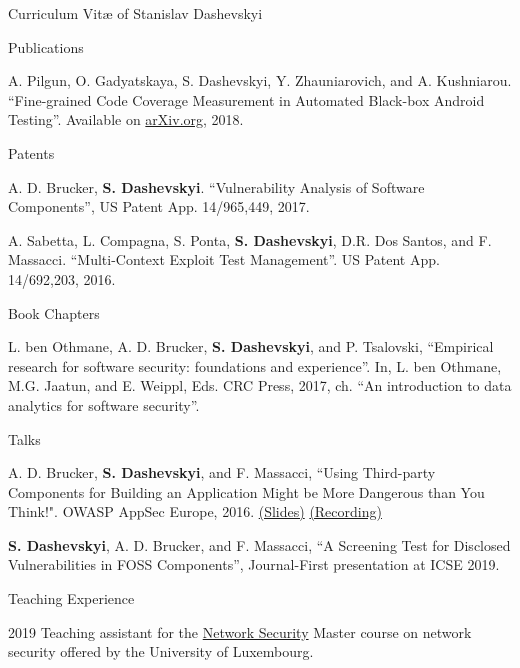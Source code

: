 \documentclass[11pt]{custom-style}
\begin{document}
\begin{cv}{Curriculum Vit\ae{} of Stanislav Dashevskyi}
\begin{cvlist}{Publications}
\begin{etaremune}
        \item A. Pilgun, O. Gadyatskaya, S. Dashevskyi, Y. Zhauniarovich, and A. Kushniarou. ``Fine-grained Code
            Coverage Measurement in Automated Black-box Android Testing''. Available on \href{https://arxiv.org/pdf/1812.10729}{arXiv.org}, 2018.
    \end{etaremune}
  \item[Patents]
    \begin{etaremune}
    \item A. D. Brucker, \textbf{S. Dashevskyi}. ``Vulnerability
      Analysis of Software Components'', US Patent App. 14/965,449,
      2017.
    \item A. Sabetta, L. Compagna, S. Ponta, \textbf{S. Dashevskyi},
      D.R. Dos Santos, and F. Massacci. ``Multi-Context Exploit Test
      Management''. US Patent App. 14/692,203, 2016.
    \end{etaremune}
  \item[Book Chapters]
    \begin{etaremune}
    \item L. ben Othmane, A. D. Brucker, \textbf{S. Dashevskyi}, and
      P. Tsalovski, ``Empirical research for software security:
      foundations and experience''. In, L. ben Othmane, M.G. Jaatun,
      and E. Weippl, Eds. CRC Press, 2017, ch. ``An introduction to
      data analytics for software security''.
    \end{etaremune}
    \item[Talks]
      \begin{etaremune}
      \item A. D. Brucker, \textbf{S. Dashevskyi}, and F. Massacci,
        ``Using Third-party Components for Building an Application
        Might be More Dangerous than You Think!". OWASP AppSec Europe,
        2016.
        \href{https://www.brucker.ch/bibliography/download/2016/talk-brucker.ea-owasp-third-party-security-2016-2x2.pdf}{(Slides)}
        \href{https://www.youtube.com/watch?v=zUDaP0m-gFU&feature=youtu.be}{(Recording)}
    \item \textbf{S. Dashevskyi}, A. D. Brucker, and F. Massacci,
        ``A Screening Test for Disclosed Vulnerabilities in FOSS Components'', Journal-First presentation at ICSE 2019.
      \end{etaremune}
  \end{cvlist}

  \begin{cvlist}{Teaching Experience}
      \item[2019] Teaching assistant for the \href{http://satoss.uni.lu/courses/networksecurity/}{Network Security}
                Master course on network security offered by the University of Luxembourg.


\end{cvlist}
\end{cv}
\end{document}
